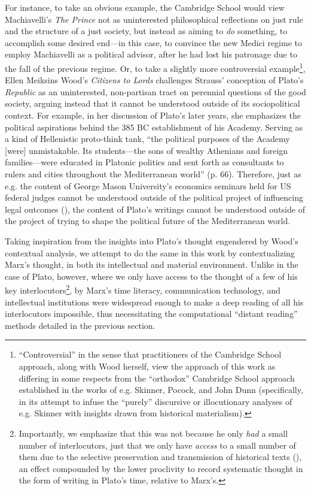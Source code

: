 \documentclass[11pt]{article}
\begin{document}
For instance, to take an obvious example, the Cambridge School would view Machiavelli's \textit{The Prince} not as uninterested philosophical reflections on just rule and the structure of a just society, but instead as aiming to \textit{do} something, to accomplish some desired end---in this case, to convince the new Medici regime to employ Machiavelli as a political advisor, after he had lost his patronage due to the fall of the previous regime. Or, to take a slightly more controversial example\footnote{``Controversial'' in the sense that practitioners of the Cambridge School approach, along with Wood herself, view the approach of this work as differing in some respects from the ``orthodox'' Cambridge School approach established in the works of e.g. Skinner, Pocock, and John Dunn (specifically, in its attempt to infuse the ``purely'' discursive or illocutionary analyses of e.g. Skinner with insights drawn from historical materialism).}, Ellen Meiksins Wood's \textit{Citizens to Lords} \cite{wood_citizens_2008} challenges Strauss' conception of Plato's \textit{Republic} as an uninterested, non-partisan tract on perennial questions of the good society, arguing instead that it cannot be understood outside of its sociopolitical context. For example, in her discussion of Plato's later years, she emphasizes the political aspirations behind the 385 BC establishment of his Academy. Serving as a kind of Hellenistic proto-think tank, ``the political purposes of the Academy [were] unmistakable. Its students---the sons of wealthy Athenians and foreign families---were educated in Platonic politics and sent forth as consultants to rulers and cities throughout the Mediterranean world'' (p. 66). Therefore, just as e.g. the content of George Mason University's economics seminars held for US federal judges cannot be understood outside of the political project of influencing legal outcomes (\cite{ash_ideas_2017}), the content of Plato's writings cannot be understood outside of the project of trying to shape the political future of the Mediterranean world.
	
Taking inspiration from the insights into Plato's thought engendered by Wood's contextual analysis, we attempt to do the same in this work by contextualizing Marx's thought, in both its intellectual and material environment. Unlike in the case of Plato, however, where we only have access to the thought of a few of his key interlocutors\footnote{Importantly, we emphasize that this was not because he only \textit{had} a small number of interlocutors, just that we only have \textit{access} to a small number of them due to the selective preservation and transmission of historical texts (\cite{shapiro_selective_1987}), an effect compounded by the lower proclivity to record systematic thought in the form of writing in Plato's time, relative to Marx's.}, by Marx's time literacy, communication technology, and intellectual institutions were widespread enough to make a deep reading of all his interlocutors impossible, thus necessitating the computational ``distant reading'' methods detailed in the previous section.
	
\end{document}
